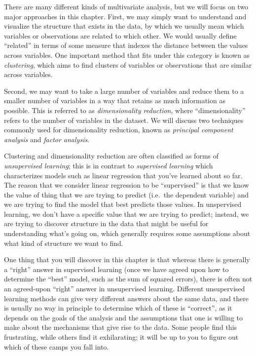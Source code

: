\documentclass[
  12pt,
]{book}
\begin{document}
There are many different kinds of multivariate analysis, but we will focus on two major approaches in this chapter. First, we may simply want to understand and visualize the structure that exists in the data, by which we usually mean which variables or observations are related to which other. We would usually define ``related'' in terms of some measure that indexes the distance between the values across variables. One important method that fits under this category is known as \emph{clustering}, which aims to find clusters of variables or observations that are similar across variables.

Second, we may want to take a large number of variables and reduce them to a smaller number of variables in a way that retains as much information as possible. This is referred to as \emph{dimensionality reduction}, where ``dimensionality'' refers to the number of variables in the dataset. We will discuss two techniques commonly used for dimensionality reduction, known as \emph{principal component analysis} and \emph{factor analysis}.

Clustering and dimensionality reduction are often classified as forms of \emph{unsupervised learning}; this is in contrast to \emph{supervised learning} which characterizes models such as linear regression that you've learned about so far. The reason that we consider linear regression to be ``supervised'' is that we know the value of thing that we are trying to predict (i.e.~the dependent variable) and we are trying to find the model that best predicts those values. In unspervised learning, we don't have a specific value that we are trying to predict; instead, we are trying to discover structure in the data that might be useful for understanding what's going on, which generally requires some assumptions about what kind of structure we want to find.

One thing that you will discover in this chapter is that whereas there is generally a ``right'' answer in supervised learning (once we have agreed upon how to determine the ``best'' model, such as the sum of squared errors), there is often not an agreed-upon ``right'' answer in unsupervised learning. Different unsupervised learning methods can give very different answers about the same data, and there is usually no way in principle to determine which of these is ``correct'', as it depends on the goals of the analysis and the assumptions that one is willing to make about the mechanisms that give rise to the data. Some people find this frustrating, while others find it exhilarating; it will be up to you to figure out which of these camps you fall into.
\end{document}
